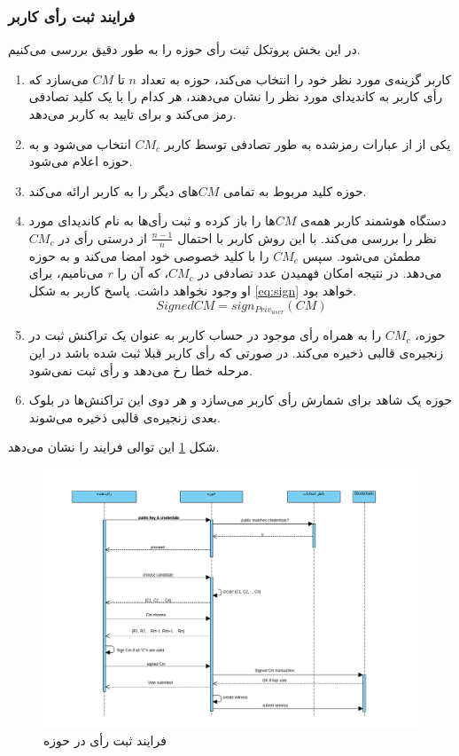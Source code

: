 \subsubsection{فرایند ثبت رأی کاربر}
در این بخش پروتکل ثبت رأی حوزه را به طور دقیق بررسی می‌کنیم. 

\begin{enumerate}
	\item 
	کاربر گزینه‌ی مورد نظر خود را انتخاب می‌کند، حوزه به تعداد $n$ تا $CM$ می‌سازد که رأی کاربر به کاندیدای مورد نظر را نشان می‌دهند، هر کدام را با یک کلید تصادفی رمز می‌کند و برای تایید به کاربر می‌دهد. 
	\item 
	یکی از از عبارات رمزشده به طور تصادفی توسط کاربر $CM_c$ انتخاب می‌شود و به حوزه اعلام می‌شود.
	\item 
	حوزه کلید مربوط به تمامی $CM$های دیگر را به کاربر ارائه می‌کند.
	\item 
	دستگاه هوشمند کاربر همه‌ی $CM$ها را باز کرده و ثبت رأی‌ها به نام کاندیدای مورد نظر را بررسی می‌کند. با این روش کاربر با احتمال $\frac{n-1}{n}$ از درستی رأی در $CM_c$ مطمئن می‌شود. سپس $CM_c$ را با کلید خصوصی خود امضا می‌کند و به حوزه می‌دهد. در نتیجه‌ امکان فهمیدن عدد تصادفی در $CM_c$، که آن را $r$ می‌نامیم، برای او وجود نخواهد داشت. پاسخ کاربر به شکل \ref{eq:sign} خواهد بود.
	\begin{equation}
	SignedCM = sign_{Priv_{user}} (CM)
	\label{eq:sign}
	\end{equation}
	
	\item
	حوزه، $CM_c$ را به همراه رأی موجود در حساب کاربر به عنوان یک تراکنش ثبت در زنجیره‌ی قالبی ذخیره می‌کند. در صورتی که رأی کاربر قبلا ثبت شده باشد در این مرحله خطا رخ می‌دهد و رأی ثبت نمی‌شود. 
	\item
	حوزه یک شاهد برای شمارش رأی کاربر می‌سازد و هر دوی این تراکنش‌ها در بلوک بعدی زنجیره‌ی قالبی ذخیره می‌شوند.
\end{enumerate}
شکل \ref{fig:seqdiag.png} این توالی فرایند را نشان می‌دهد.
\begin{figure}[h!]
	\centering
	\includegraphics[width=0.9\linewidth]{seqdiag.png}
	\caption {فرایند ثبت رأی در حوزه}
	\label{fig:seqdiag.png}
\end{figure}

